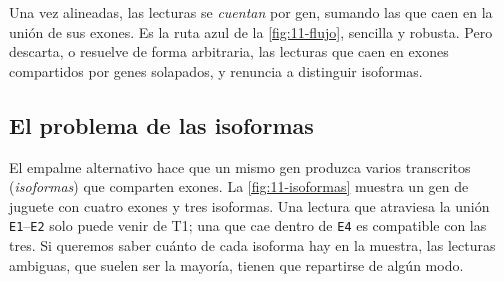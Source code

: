 Una vez alineadas, las lecturas se \emph{cuentan} por gen, sumando las que caen en la unión de sus exones. Es la ruta azul de la \cref{fig:11-flujo}, sencilla y robusta. Pero descarta, o resuelve de forma arbitraria, las lecturas que caen en exones compartidos por genes solapados, y renuncia a distinguir isoformas.

\subsection{El problema de las isoformas}

El empalme alternativo hace que un mismo gen produzca varios transcritos (\emph{isoformas}) que comparten exones. La \cref{fig:11-isoformas} muestra un gen de juguete con cuatro exones y tres isoformas. Una lectura que atraviesa la unión \texttt{E1}--\texttt{E2} solo puede venir de T1; una que cae dentro de \texttt{E4} es compatible con las tres. Si queremos saber cuánto de cada isoforma hay en la muestra, las lecturas ambiguas, que suelen ser la mayoría, tienen que repartirse de algún modo.

